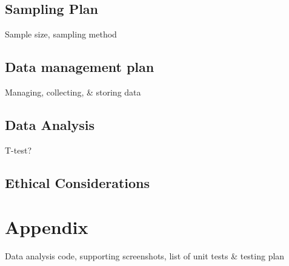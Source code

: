 \documentclass[lettersize,journal]{IEEEtran}
\begin{document}
    \subsection{Sampling Plan}
        Sample size, sampling method

    \subsection{Data management plan}
        Managing, collecting, \& storing data

    \subsection{Data Analysis}
        T-test?
    \subsection{Ethical Considerations}

\section{Appendix}
    Data analysis code, supporting screenshots, list of unit tests \& testing plan



\end{document}
